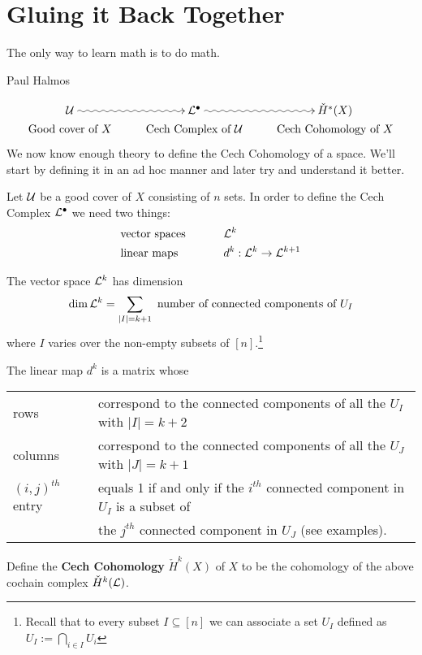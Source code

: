 
\section{Gluing it Back Together}
\epigraph{The only way to learn math is to do math.}{Paul Halmos}
\begin{align*}
	\xymatrix@R-2pc{
	\U \ar@{~>}[r]          & \L^\bullet \ar@{~>}[r]     & \check H^*(X)                \\
	\mbox{Good cover of } X & \mbox{Cech Complex of } \U & \mbox{Cech Cohomology of } X
	}
\end{align*}
We now know enough theory to define the {Cech Cohomology} of a space. We'll start by defining it in an ad hoc manner and later try and understand it better.

Let $\mathcal{U}$ be a good cover of $X$ consisting of $n$ sets. In order to define the Cech Complex $\mathcal{L}^\bullet$ we need two things:
\begin{alignat*}{4}
	 & \mbox{vector spaces } &  & \qquad \mathcal{L}^k                          \\
	 & \mbox{linear maps }   &  & \qquad d^k: \mathcal{L}^k\rightarrow \mathcal{L}^{k+1}
\end{alignat*}

\begin{definition}
	The vector space $\mathcal{L}^k$ has dimension
	\begin{align*}
		\dim \mathcal{L}^k = \sum \limits_{|I| = k+1} \mbox{ number of connected components of } U_I
	\end{align*}
	where $I$ varies over the non-empty subsets of $[n]$.\footnote{Recall that to every subset $ I \subseteq [n]$ we can associate a set $U_I $ defined as $U_I := \bigcap_{i \in I} U_i$}
\end{definition}
\begin{definition}
	The linear map $d^k$ is a matrix whose \\
  \begin{tabular}{l l}
  rows & correspond to the connected components of all the $U_I$ with $|I|=k+2$ \\
  columns & correspond to the connected components of all the $U_J$ with $|J|=k+1$ \\
  $(i,j)^{th}$ entry & equals 1 if and only if the $i^{th}$ connected component in $U_I$ is a subset of \\
  & the $j^{th}$ connected component in $U_J$ (see examples).
  \end{tabular}
\end{definition}
\begin{definition}
	Define the \textbf{Cech Cohomology} $\check H^k(X)$ of $X$ to be the cohomology of the above cochain complex $\check H^k(\mathcal{L})$.
\end{definition}

